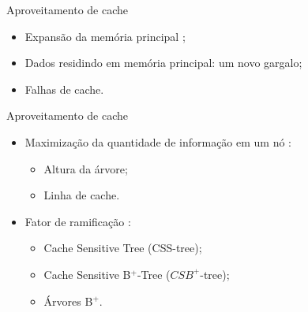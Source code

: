 \begin{frame}{Aproveitamento de cache}
    \begin{itemize}
        \item Expansão da memória principal \citep{paper-effect-node-size-cache-b-trees};
        \item Dados residindo em memória principal: um novo gargalo;
        \item Falhas de cache.
    \end{itemize}
\end{frame}

\begin{frame}{Aproveitamento de cache}
    \begin{itemize}
        \item Maximização da quantidade de informação em um nó \citep{paper-effect-node-size-cache-b-trees}:
        \begin{itemize}
            \item Altura da árvore;
            \item Linha de cache.
        \end{itemize}
        \item Fator de ramificação \citep{paper-making-btree-cache}:
        \begin{itemize}
            \item Cache Sensitive Tree (CSS-tree);
            \item Cache Sensitive B$^+$-Tree ($CSB^+$-tree);
            \item Árvores B$^+$.
        \end{itemize}
    \end{itemize}
\end{frame}